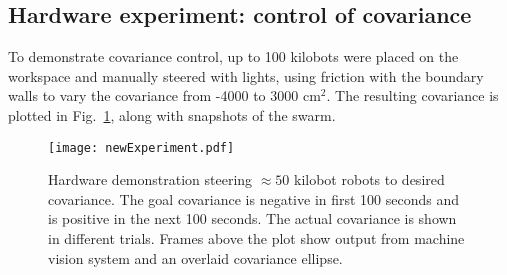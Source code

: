 \subsection{Hardware experiment: control of covariance}
To demonstrate covariance control, up to 100 kilobots were placed on the workspace and manually steered with lights, using friction with the boundary walls to vary the covariance from  -4000 to 3000 cm$^2$.  The resulting covariance is plotted in Fig.~\ref{fig:covExperiment}, along with snapshots of the swarm.




\begin{figure}
\begin{center}
	\texttt{[image: newExperiment.pdf]}
\end{center}
\caption{\label{fig:covExperiment}
Hardware demonstration steering $\approx 50$ kilobot robots to desired covariance. The goal covariance is negative in first 100 seconds and is positive in the next 100 seconds. The actual covariance is shown in different trials. Frames above the plot show output from machine vision system and an overlaid covariance ellipse.
}
\end{figure}

